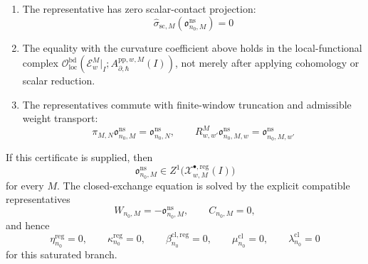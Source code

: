 \begin{prop}
\begin{enumerate}[label=(R\arabic*)]
\[      \]
      where all defect cotangent labels are smooth compactly supported
      densities \(b_{\Gamma,\ell,j}(t)dt\), all coefficient labels lie in
      degree \(\leq M\), and \(B^{\mathrm{reg}}_{n_0,M}\) is a
      regular-density local counterterm in the graph/counterterm habitat.
    \item The representative has zero scalar-contact projection:
      \[
        \widehat\sigma_{\mathrm{sc},M}
        (\mathfrak o^{\mathrm{ns}}_{n_0,M})=0
      \]
    \item The equality with the curvature coefficient above holds in the
      local-functional complex
      \(\mathcal O_{\mathrm{loc}}^{\mathrm{bd}}
      (\mathcal E_w^M|_I;
      A_{\partial,\hbar}^{\mathrm{pp},w,M}(I))\), not merely after
      applying cohomology or scalar reduction.
    \item The representatives commute with finite-window truncation and
      admissible weight transport:
      \[
        \pi_{M,N}\mathfrak o^{\mathrm{ns}}_{n_0,M}
          =
        \mathfrak o^{\mathrm{ns}}_{n_0,N},
        \qquad
        R^M_{w,w'}\mathfrak o^{\mathrm{ns}}_{n_0,M,w}
          =
        \mathfrak o^{\mathrm{ns}}_{n_0,M,w'}
      \]
  \end{enumerate}

  If this certificate is supplied, then
  \[
    \mathfrak o^{\mathrm{ns}}_{n_0,M}
      \in
    Z^1\bigl(\mathcal X^{\bullet,\mathrm{reg}}_{w,M}(I)\bigr)
  \]
  for every \(M\).  The closed-exchange equation is solved by the explicit
  compatible representatives
  \[
    W_{n_0,M}=-\mathfrak o^{\mathrm{ns}}_{n_0,M},
    \qquad
    C_{n_0,M}=0,
  \]
  and hence
  \[
    \eta^{\mathrm{reg}}_{n_0}=0,\qquad
    \kappa^{\mathrm{reg}}_{n_0}=0,\qquad
    \beta^{\mathrm{cl},\mathrm{reg}}_{n_0}=0,\qquad
    \mu^{\mathrm{cl}}_{n_0}=0,\qquad
    \lambda^{\mathrm{cl}}_{n_0}=0
  \]
  for this saturated branch.


\end{prop}
